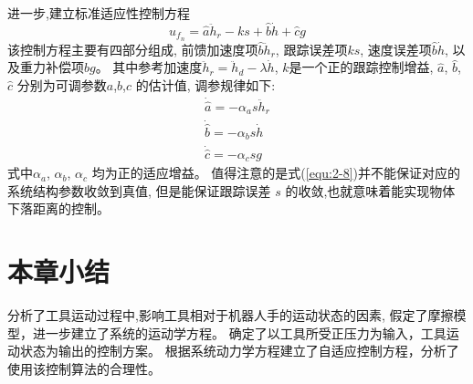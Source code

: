 进一步,建立标准适应性控制方程 \cite{ref10}
\begin{equation}
  {u_{{f_n}}} = \hat a{\ddot h_r} - ks + \hat b\dot h + \hat cg
  \label{equ:2-7}
\end{equation}
该控制方程主要有四部分组成,
前馈加速度项$\hat b{\ddot h_r}$, 跟踪误差项$ks$,
速度误差项$\hat b\dot h$, 以及重力补偿项$\hat bg$。
其中参考加速度${\ddot h_r} = {\ddot h_d} - \lambda \dot h$,
$k$是一个正的跟踪控制增益, $\hat a$, $\hat b$, $\hat c$ 分别为可调参数$a$,$b$,$c$ 的估计值, 调参规律如下:
\begin{equation}
  \label{equ:2-8}
  \begin{array}{l}
    \dot{\hat a} = - {\alpha _a}s{{\ddot h}_r}\\
    \dot{\hat b} = - {\alpha _b}s\dot h\\
    \dot{\hat c} = - {\alpha _c}sg
  \end{array}
\end{equation}
式中${\alpha _a}$, ${\alpha _b}$, ${\alpha _c}$ 均为正的适应增益。
值得注意的是式(\ref{equ:2-8})并不能保证对应的系统结构参数收敛到真值,
但是能保证跟踪误差 $s$ 的收敛,也就意味着能实现物体下落距离的控制。


\section{本章小结}
分析了工具运动过程中,影响工具相对于机器人手的运动状态的因素,
假定了摩擦模型，进一步建立了系统的运动学方程。
确定了以工具所受正压力为输入，工具运动状态为输出的控制方案。
根据系统动力学方程建立了自适应控制方程，分析了使用该控制算法的合理性。

